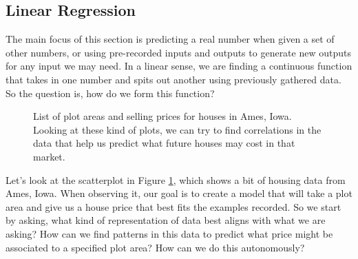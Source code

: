 \subsection{Linear Regression}




The main focus of this section is predicting a real number when given a set of
other numbers, or using pre-recorded inputs and outputs to generate new outputs
for any input we may need. In a linear sense, we are finding a continuous
function that takes in one number and spits out another using previously
gathered data. So the question is, how do we form this function?


\begin{figure}[t!]
\centering
    \caption{List of plot areas and selling prices for houses in Ames, Iowa.
    Looking at these kind of plots, we can try to find correlations in the data
    that help us predict what future houses may cost in that market.}
    \label{fig:hp}
\end{figure}

Let's look at the scatterplot in Figure \ref{fig:hp}, which shows a bit of
housing data from Ames, Iowa. When observing it, our goal is to create a model
that will take a plot area and give us a house price that best fits the examples
recorded. So we start by asking, what kind of representation of data best aligns
with what we are asking? How can we find patterns in this data to predict what
price might be associated to a specified plot area? How can we do this
autonomously?

